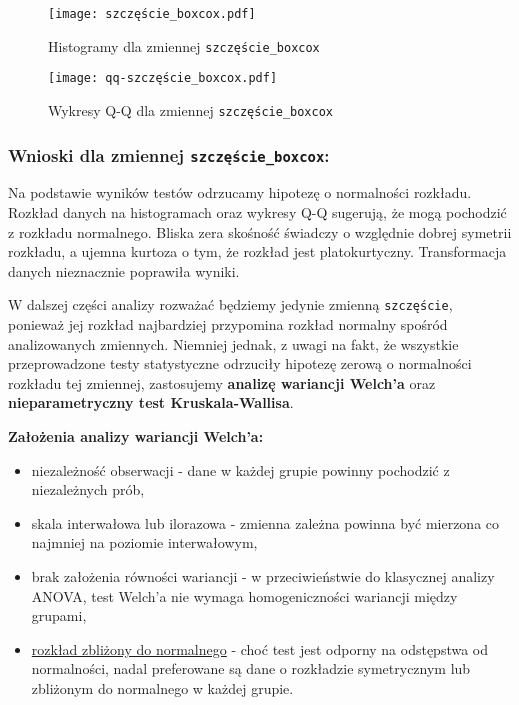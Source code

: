 \documentclass[12pt,a4paper]{article}
\begin{document}
\begin{figure}[H]
    \centering
    \texttt{[image: szczęście\_boxcox.pdf]}
    \caption{Histogramy dla zmiennej \texttt{szczęście\_boxcox}}
\end{figure}
\begin{figure}[H]
    \centering
    \texttt{[image: qq-szczęście\_boxcox.pdf]}
    \caption{Wykresy Q-Q dla zmiennej \texttt{szczęście\_boxcox}}
\end{figure}
\subsubsection*{Wnioski dla zmiennej \texttt{szczęście\_boxcox}:}
Na podstawie wyników testów odrzucamy hipotezę o normalności rozkładu. Rozkład danych na histogramach oraz wykresy Q-Q sugerują, że mogą pochodzić z rozkładu normalnego. Bliska zera skośność świadczy o względnie dobrej symetrii rozkładu, a ujemna kurtoza o tym, że rozkład jest platokurtyczny. Transformacja danych nieznacznie poprawiła wyniki.

\newpage

W dalszej części analizy rozważać będziemy jedynie zmienną \texttt{szczęście}, ponieważ jej rozkład najbardziej przypomina rozkład normalny spośród analizowanych zmiennych. Niemniej jednak, z uwagi na fakt, że wszystkie przeprowadzone testy statystyczne odrzuciły hipotezę zerową o normalności rozkładu tej zmiennej, zastosujemy \textbf{analizę wariancji Welch'a} oraz \textbf{nieparametryczny test Kruskala-Wallisa}.

\vspace{4mm}
\textbf{Założenia analizy wariancji Welch'a:}
\begin{itemize}
    \item niezależność obserwacji - dane w każdej grupie powinny pochodzić z niezależnych prób,
    \item skala interwałowa lub ilorazowa - zmienna zależna powinna być mierzona co najmniej na poziomie interwałowym,
    \item brak założenia równości wariancji - w przeciwieństwie do klasycznej analizy ANOVA, test Welch’a nie wymaga homogeniczności wariancji między grupami,
    \item \underline{rozkład zbliżony do normalnego} - choć test jest odporny na odstępstwa od normalności, nadal preferowane są dane o rozkładzie symetrycznym lub zbliżonym do normalnego w każdej grupie.
\end{itemize}
\end{document}
